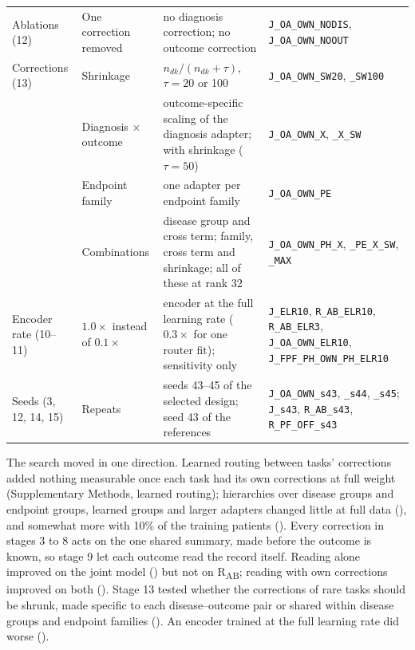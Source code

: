 \begin{table}[htbp]
\begin{tabularx}{\textwidth}{@{}>{\raggedright\arraybackslash}p{}>{\raggedright\arraybackslash}p{}>{\raggedright\arraybackslash}X>{\raggedright\arraybackslash}p{}@{}}
Ablations (12) & One correction removed & no diagnosis correction; no outcome correction & \texttt{J\_OA\_OWN\_NODIS}, \texttt{J\_OA\_OWN\_NOOUT} \\
Corrections (13) & Shrinkage & $n_{dk}/(n_{dk}+\tau)$, $\tau=20$ or 100 & \texttt{J\_OA\_OWN\_SW20}, \texttt{\_SW100} \\
 & Diagnosis $\times$ outcome & outcome-specific scaling of the diagnosis adapter; with shrinkage ($\tau=50$) & \texttt{J\_OA\_OWN\_X}, \texttt{\_X\_SW} \\
 & Endpoint family & one adapter per endpoint family & \texttt{J\_OA\_OWN\_PE} \\
 & Combinations & disease group and cross term; family, cross term and shrinkage; all of these at rank 32 & \texttt{J\_OA\_OWN\_PH\_X}, \texttt{\_PE\_X\_SW}, \texttt{\_MAX} \\
Encoder rate (10--11) & $1.0\times$ instead of $0.1\times$ & encoder at the full learning rate ($0.3\times$ for one router fit); sensitivity only & \texttt{J\_ELR10}, \texttt{R\_AB\_ELR10}, \texttt{R\_AB\_ELR3}, \texttt{J\_OA\_OWN\_ELR10}, \texttt{J\_FPF\_PH\_OWN\_PH\_ELR10} \\
Seeds (3, 12, 14, 15) & Repeats & seeds 43--45 of the selected design; seed 43 of the references & \texttt{J\_OA\_OWN\_s43}, \texttt{\_s44}, \texttt{\_s45}; \texttt{J\_s43}, \texttt{R\_AB\_s43}, \texttt{R\_PF\_OFF\_s43} \\
\bottomrule
\end{tabularx}
\end{table}

The search moved in one direction. Learned routing between tasks' corrections
added nothing measurable once each task had its own corrections at full weight
(Supplementary Methods, learned routing); hierarchies over disease groups and endpoint groups,
learned groups and larger adapters changed little at full data
(), and
somewhat more with 10\% of the training patients
(). Every correction in
stages 3 to 8 acts on the one shared summary, made before the outcome is known,
so stage 9 let each outcome read the record itself. Reading alone improved on
the joint model () but not on
R\textsubscript{AB}; reading with own corrections improved on both
(). Stage 13 tested whether the corrections of rare tasks
should be shrunk, made specific to each disease--outcome pair or shared within
disease groups and endpoint families (). An encoder trained at the full learning rate did worse
().

